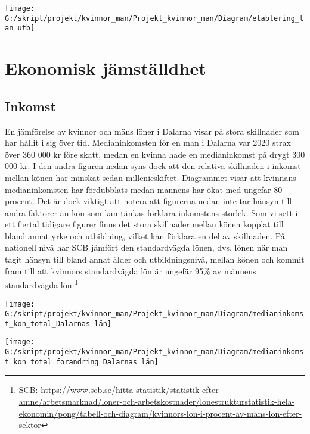 \documentclass[
]{article}
\begin{document}
\begin{center}\texttt{[image: G:/skript/projekt/kvinnor\_man/Projekt\_kvinnor\_man/Diagram/etablering\_lan\_utb]} \end{center}

\hypertarget{ekonomisk-juxe4mstuxe4lldhet}{%
\section{Ekonomisk jämställdhet}\label{ekonomisk-juxe4mstuxe4lldhet}}

\hypertarget{inkomst}{%
\subsection{Inkomst}\label{inkomst}}

En jämförelse av kvinnor och mäns löner i Dalarna visar på stora
skillnader som har hållit i sig över tid. Medianinkomsten för en man i
Dalarna var 2020 strax över 360 000 kr före skatt, medan en kvinna hade
en medianinkomst på drygt 300 000 kr. I den andra figuren nedan syns
dock att den relativa skillnaden i inkomst mellan könen har minskat
sedan millenieskiftet. Diagrammet visar att kvinnans medianinkomsten har
fördubblats medan mannens har ökat med ungefär 80 procent. Det är dock
viktigt att notera att figurerna nedan inte tar hänsyn till andra
faktorer än kön som kan tänkas förklara inkomstens storlek. Som vi sett
i ett flertal tidigare figurer finns det stora skillnader mellan könen
kopplat till bland annat yrke och utbildning, vilket kan förklara en del
av skillnaden. På nationell nivå har SCB jämfört den standardvägda
lönen, dvs. lönen när man tagit hänsyn till bland annat ålder och
utbildningsnivå, mellan könen och kommit fram till att kvinnors
standardvägda lön är ungefär 95\% av männens standardvägda lön
\footnote{SCB:
  \url{https://www.scb.se/hitta-statistik/statistik-efter-amne/arbetsmarknad/loner-och-arbetskostnader/lonestrukturstatistik-hela-ekonomin/pong/tabell-och-diagram/kvinnors-lon-i-procent-av-mans-lon-efter-sektor}}

\begin{center}\texttt{[image: G:/skript/projekt/kvinnor\_man/Projekt\_kvinnor\_man/Diagram/medianinkomst\_kon\_total\_Dalarnas län]} \end{center}

\begin{center}\texttt{[image: G:/skript/projekt/kvinnor\_man/Projekt\_kvinnor\_man/Diagram/medianinkomst\_kon\_total\_forandring\_Dalarnas län]} \end{center}
\end{document}
